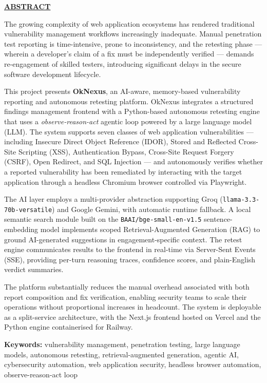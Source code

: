 {\centering
    \par
    \large \textbf{\underline{ABSTRACT}} \par
}\vspace{0.7cm}

\noindent The growing complexity of web application ecosystems has rendered traditional vulnerability management workflows increasingly inadequate. Manual penetration test reporting is time-intensive, prone to inconsistency, and the retesting phase --- wherein a developer's claim of a fix must be independently verified --- demands re-engagement of skilled testers, introducing significant delays in the secure software development lifecycle.

\noindent This project presents \textbf{OkNexus}, an AI-aware, memory-based vulnerability reporting and autonomous retesting platform. OkNexus integrates a structured findings management frontend with a Python-based autonomous retesting engine that uses a \textit{observe-reason-act} agentic loop powered by a large language model (LLM). The system supports seven classes of web application vulnerabilities --- including Insecure Direct Object Reference (IDOR), Stored and Reflected Cross-Site Scripting (XSS), Authentication Bypass, Cross-Site Request Forgery (CSRF), Open Redirect, and SQL Injection --- and autonomously verifies whether a reported vulnerability has been remediated by interacting with the target application through a headless Chromium browser controlled via Playwright.

\noindent The AI layer employs a multi-provider abstraction supporting Groq (\texttt{llama-3.3-70b-versatile}) and Google Gemini, with automatic runtime fallback. A local semantic search module built on the \texttt{BAAI/bge-small-en-v1.5} sentence-embedding model implements scoped Retrieval-Augmented Generation (RAG) to ground AI-generated suggestions in engagement-specific context. The retest engine communicates results to the frontend in real-time via Server-Sent Events (SSE), providing per-turn reasoning traces, confidence scores, and plain-English verdict summaries.

\noindent The platform substantially reduces the manual overhead associated with both report composition and fix verification, enabling security teams to scale their operations without proportional increases in headcount. The system is deployable as a split-service architecture, with the Next.js frontend hosted on Vercel and the Python engine containerised for Railway.

\vspace{0.5cm}
\noindent\textbf{Keywords:} vulnerability management, penetration testing, large language models, autonomous retesting, retrieval-augmented generation, agentic AI, cybersecurity automation, web application security, headless browser automation, observe-reason-act loop
